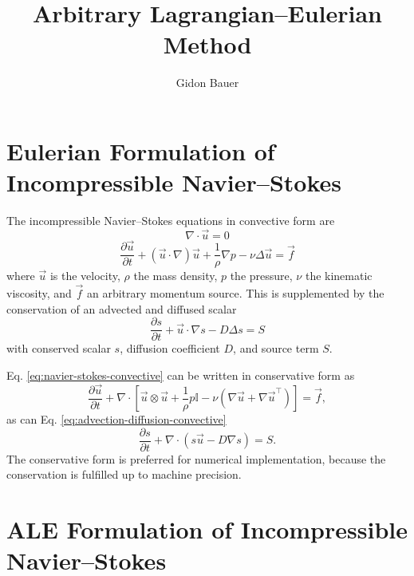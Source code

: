 \documentclass{article}
\title{Arbitrary Lagrangian--Eulerian Method}
\author{Gidon Bauer}
\newcommand{\pd}[2]{\dfrac{\partial #1}{\partial #2}}
\begin{document}
\maketitle

\section{Eulerian Formulation of Incompressible Navier--Stokes}

The incompressible Navier--Stokes equations in convective form are
\begin{equation}
    \nabla \cdot \vec{u} = 0
    \label{eq:continuity}
\end{equation}
\begin{equation}
    \pd{\vec{u}}{t} +
    \left(\vec{u} \cdot \nabla\right) \vec{u} +
    \frac{1}{\rho} \nabla p -
    \nu \Delta \vec{u} =
    \vec{f}
    \label{eq:navier-stokes-convective}
\end{equation}
where $\vec{u}$ is the velocity, $\rho$ the mass density, $p$ the pressure, $\nu$ the kinematic viscosity, and $\vec{f}$ an arbitrary momentum source.
This is supplemented by the conservation of an advected and diffused scalar
\begin{equation}
    \pd{s}{t} + \vec{u} \cdot \nabla s - D \Delta s = S
    \label{eq:advection-diffusion-convective}
\end{equation}
with conserved scalar $s$, diffusion coefficient $D$, and source term $S$.

Eq. \eqref{eq:navier-stokes-convective} can be written in conservative form as
\begin{equation}
    \pd{\vec{u}}{t} + \nabla \cdot \left[
        \vec{u} \otimes \vec{u} +
        \frac{1}{\rho} p \mathbb{I} -
        \nu \left(\nabla \vec{u} + \nabla \vec{u}^\top\right)
    \right] = \vec{f},
    \label{eq:navier-stokes-conservative}
\end{equation}
as can Eq. \eqref{eq:advection-diffusion-convective}
\begin{equation}
    \pd{s}{t} + \nabla \cdot \left(s\vec{u} - D \nabla s\right) = S.
    \label{eq:advection-diffusion-conservative}
\end{equation}
The conservative form is preferred for numerical implementation, because the conservation is fulfilled up to machine precision.

\section{ALE Formulation of Incompressible Navier--Stokes}
\end{document}
